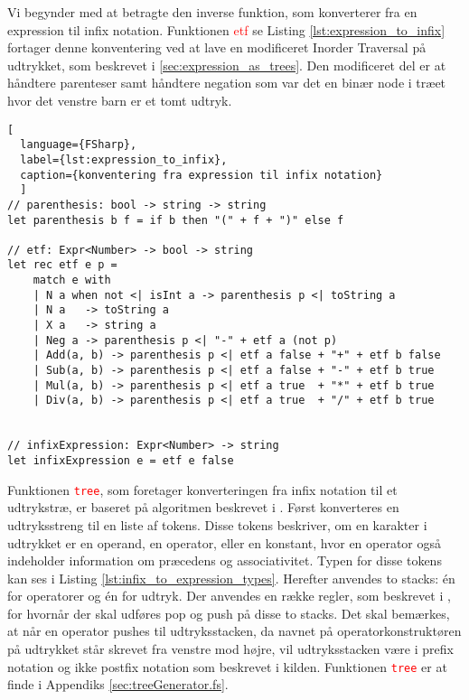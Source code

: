 Vi begynder med at betragte den inverse funktion, som konverterer fra en expression til infix notation. Funktionen \textcolor{red}{etf} se Listing \ref{lst:expression_to_infix} fortager denne konventering ved at lave en modificeret Inorder Traversal på udtrykket, som beskrevet i \ref{sec:expression_as_trees}. Den modificeret del er at håndtere parenteser samt håndtere negation som var det en binær node i træet hvor det venstre barn er et tomt udtryk.

\begin{lstlisting}[
  language={FSharp}, 
  label={lst:expression_to_infix}, 
  caption={konventering fra expression til infix notation}
  ]
// parenthesis: bool -> string -> string
let parenthesis b f = if b then "(" + f + ")" else f

// etf: Expr<Number> -> bool -> string
let rec etf e p =
    match e with
    | N a when not <| isInt a -> parenthesis p <| toString a
    | N a   -> toString a
    | X a   -> string a
    | Neg a -> parenthesis p <| "-" + etf a (not p) 
    | Add(a, b) -> parenthesis p <| etf a false + "+" + etf b false
    | Sub(a, b) -> parenthesis p <| etf a false + "-" + etf b true
    | Mul(a, b) -> parenthesis p <| etf a true  + "*" + etf b true
    | Div(a, b) -> parenthesis p <| etf a true  + "/" + etf b true


// infixExpression: Expr<Number> -> string
let infixExpression e = etf e false
\end{lstlisting}

Funktionen \textcolor{red}{\texttt{tree}}, som foretager konverteringen fra infix notation til et udtrykstræ, er baseret på algoritmen beskrevet i \cite{convert_expression}. Først konverteres en udtryksstreng til en liste af tokens. Disse tokens beskriver, om en karakter i udtrykket er en operand, en operator, eller en konstant, hvor en operator også indeholder information om præcedens og associativitet. Typen for disse tokens kan ses i Listing \ref{lst:infix_to_expression_types}. Herefter anvendes to stacks: én for operatorer og én for udtryk. Der anvendes en række regler, som beskrevet i \cite{convert_expression}, for hvornår der skal udføres pop og push på disse to stacks. Det skal bemærkes, at når en operator pushes til udtryksstacken, da navnet på operatorkonstruktøren på udtrykket står skrevet fra venstre mod højre, vil udtryksstacken være i prefix notation og ikke postfix notation som beskrevet i kilden. Funktionen \textcolor{red}{\texttt{tree}} er at finde i Appendiks \ref{sec:treeGenerator.fs}.


